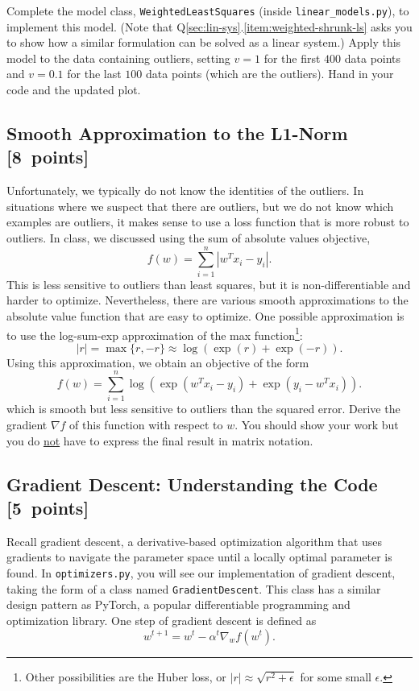 \documentclass{article}
\newcommand{\blu}[1]{{\textcolor{blu}{#1}}}
\let\ask\blu
\newcommand\pts[1]{\textcolor{pointscolour}{[#1~points]}}
\begin{document}
Complete the model class, \texttt{WeightedLeastSquares} (inside \texttt{linear\_models.py}), to implement this model.
(Note that Q\ref{sec:lin-sys}.\ref{item:weighted-shrunk-ls} asks you to show how a similar formulation can be solved as a linear system.)
Apply this model to the data containing outliers, setting $v = 1$ for the first
$400$ data points and $v = 0.1$ for the last $100$ data points (which are the outliers).
\ask{Hand in your code and the updated plot}.


\subsection{Smooth Approximation to the L1-Norm \pts{8}}

Unfortunately, we typically do not know the identities of the outliers. In situations where we suspect that there are outliers, but we do not know which examples are outliers, it makes sense to use a loss function that is more robust to outliers. In class, we discussed using the sum of absolute values objective,
\[
f(w) = \sum_{i=1}^n |w^Tx_i - y_i|.
\]
This is less sensitive to outliers than least squares, but it is non-differentiable and harder to optimize. Nevertheless, there are various smooth approximations to the absolute value function that are easy to optimize. One possible approximation is to use the log-sum-exp approximation of the max function\footnote{Other possibilities are the Huber loss, or $|r|\approx \sqrt{r^2+\epsilon}$ for some small $\epsilon$.}:
\[
|r| = \max\{r, -r\} \approx \log(\exp(r) + \exp(-r)).
\]
Using this approximation, we obtain an objective of the form
\[
f(w) {=} \sum_{i=1}^n  \log\left(\exp(w^Tx_i - y_i) + \exp(y_i - w^Tx_i)\right).
\]
which is smooth but less sensitive to outliers than the squared error. \ask{Derive
 the gradient $\nabla f$ of this function with respect to $w$. You should show your work but you do \underline{not} have to express the final result in matrix notation.}



\subsection{Gradient Descent: Understanding the Code \pts{5}}

Recall gradient descent, a derivative-based optimization algorithm that uses gradients to navigate the parameter space until a locally optimal parameter is found. In \texttt{optimizers.py}, you will see our implementation of gradient descent, taking the form of a class named \texttt{GradientDescent}. This class has a similar design pattern as PyTorch, a popular differentiable programming and optimization library. One step of gradient descent is defined as
\[
	w^{t+1} = w^t - \alpha^t \nabla_w f(w^t)
.\]
\end{document}
